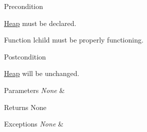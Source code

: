 \begin{DoxyPrecond}{\-Precondition}

\begin{DoxyEnumerate}
\item \hyperlink{class_heap}{\-Heap} must be declared.
\item \-Function lchild must be properly functioning.
\end{DoxyEnumerate}
\end{DoxyPrecond}
\begin{DoxyPostcond}{\-Postcondition}

\begin{DoxyEnumerate}
\item \hyperlink{class_heap}{\-Heap} will be unchanged.
\end{DoxyEnumerate}
\end{DoxyPostcond}

\begin{DoxyParams}{\-Parameters}
{\em \-None} & \\
\hline
\end{DoxyParams}
\begin{DoxyReturn}{\-Returns}
\-None
\end{DoxyReturn}

\begin{DoxyExceptions}{\-Exceptions}
{\em \-None} & \\
\hline
\end{DoxyExceptions}


